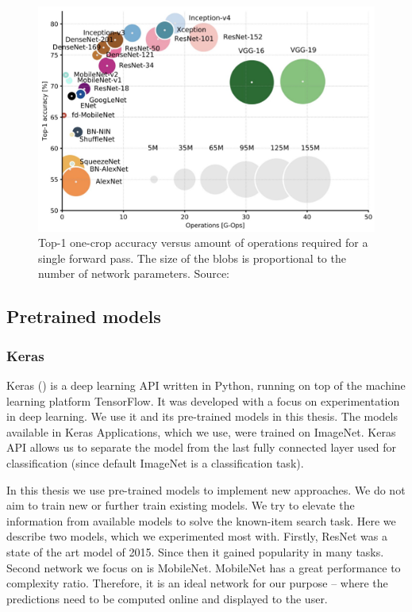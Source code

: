 \begin{figure}
    \centering
	\includegraphics[width=0.8\linewidth]{img/network-comparison.jpeg}
	\caption{Top-1 one-crop accuracy versus amount of operations required for a single forward pass. The size of the blobs is proportional to the number of network parameters. Source: \cite{canziani2016analysis}}
	\label{fig:camera-setup}
\end{figure}

\subsection{Pretrained models}
\label{ss:pretrained_models}

\subsubsection{Keras}

Keras (\cite{chollet2015keras}) is a deep learning API written in Python, running on top of the machine learning platform TensorFlow\cite{tensorflow2015-whitepaper}. It was developed with a focus on experimentation in deep learning. We use it and its pre-trained models in this thesis. The models available in Keras Applications, which we use, were trained on ImageNet. Keras API allows us to separate the model from the last fully connected layer used for classification (since default ImageNet is a classification task). 

In this thesis we use pre-trained models to implement new approaches. We do not aim to train new or further train existing models. We try to elevate the information from available models to solve the known-item search task. Here we describe two models, which we experimented most with. Firstly, ResNet was a state of the art model of 2015. Since then it gained popularity in many tasks. Second network we focus on is MobileNet. MobileNet has a great performance to complexity ratio. Therefore, it is an ideal network for our purpose -- where the predictions need to be computed online and displayed to the user.

